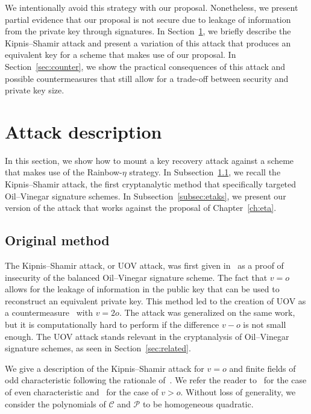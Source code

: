 \documentclass[12pt, a4paper, oneside]{memoir}
\theoremstyle{definition}
\begin{document}
We intentionally avoid this strategy with our proposal. Nonetheless, we present partial evidence that our proposal is not secure due to leakage of information from the private key through signatures. In Section~\ref{sec:atdesc}, we briefly describe the Kipnis--Shamir attack and present a variation of this attack that produces an equivalent key for a scheme that makes use of our proposal. In Section~\ref{sec:counter}, we show the practical consequences of this attack and possible countermeasures that still allow for a trade-off between security and private key size.

\section{Attack description}\label{sec:atdesc}

In this section, we show how to mount a key recovery attack against a scheme that makes use of the Rainbow-$\eta$ strategy. In Subsection~\ref{subsec:ks}, we recall the Kipnis--Shamir attack, the first cryptanalytic method that specifically targeted Oil--Vinegar signature schemes. In Subsection~\ref{subsec:etaks}, we present our version of the attack that works against the proposal of Chapter~\ref{ch:eta}.

\subsection{Original method}\label{subsec:ks}

The Kipnis--Shamir attack, or UOV attack, was first given in~\cite{Kipnis:199808} as a proof of insecurity of the balanced Oil--Vinegar signature scheme. The fact that $v = o$ allows for the leakage of information in the public key that can be used to reconstruct an equivalent private key. This method led to the creation of UOV as a countermeasure~\cite{Kipnis:199904} with $v = 2o$. The attack was generalized on the same work, but it is computationally hard to perform if the difference $v - o$ is not small enough. The UOV attack stands relevant in the cryptanalysis of Oil--Vinegar signature schemes, as seen in Section~\ref{sec:related}. 

We give a description of the Kipnis--Shamir attack for $v = o$ and finite fields of odd characteristic following the rationale of~\cite[Section 3.2]{Ding:2006}. We refer the reader to~\cite{Cao:201105} for the case of even characteristic and~\cite{Kipnis:199904} for the case of $v > o$. Without loss of generality, we consider the polynomials of $\mathcal{C}$ and $\mathcal{P}$ to be homogeneous quadratic.
\end{document}

